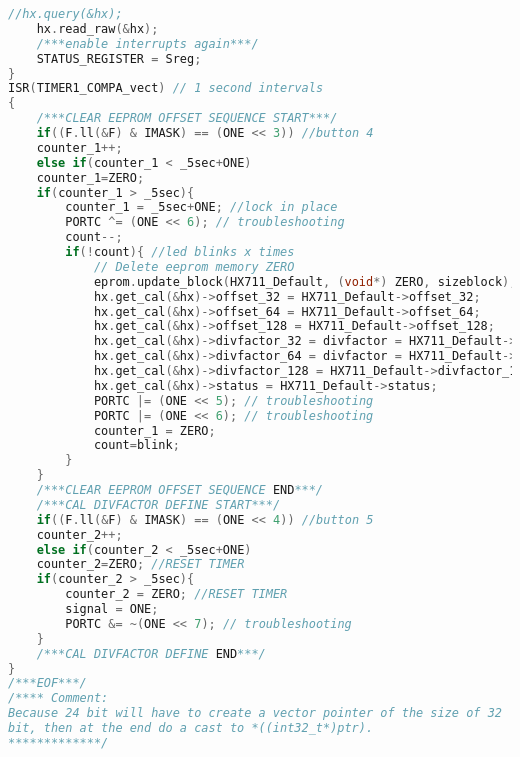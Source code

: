 \begin{lstlisting}[language=C, caption={main.c}, label=main-c, captionpos=b]
	//hx.query(&hx);	
	hx.read_raw(&hx);
	/***enable interrupts again***/
	STATUS_REGISTER = Sreg;
}
ISR(TIMER1_COMPA_vect) // 1 second intervals
{
	/***CLEAR EEPROM OFFSET SEQUENCE START***/
	if((F.ll(&F) & IMASK) == (ONE << 3)) //button 4
	counter_1++;
	else if(counter_1 < _5sec+ONE)
	counter_1=ZERO;
	if(counter_1 > _5sec){
		counter_1 = _5sec+ONE; //lock in place
		PORTC ^= (ONE << 6); // troubleshooting
		count--;
		if(!count){ //led blinks x times
			// Delete eeprom memory ZERO
			eprom.update_block(HX711_Default, (void*) ZERO, sizeblock);
			hx.get_cal(&hx)->offset_32 = HX711_Default->offset_32;
			hx.get_cal(&hx)->offset_64 = HX711_Default->offset_64;
			hx.get_cal(&hx)->offset_128 = HX711_Default->offset_128;
			hx.get_cal(&hx)->divfactor_32 = divfactor = HX711_Default->divfactor_32;
			hx.get_cal(&hx)->divfactor_64 = divfactor = HX711_Default->divfactor_64;
			hx.get_cal(&hx)->divfactor_128 = HX711_Default->divfactor_128;
			hx.get_cal(&hx)->status = HX711_Default->status;
			PORTC |= (ONE << 5); // troubleshooting
			PORTC |= (ONE << 6); // troubleshooting
			counter_1 = ZERO;
			count=blink;
		}
	}
	/***CLEAR EEPROM OFFSET SEQUENCE END***/
	/***CAL DIVFACTOR DEFINE START***/
	if((F.ll(&F) & IMASK) == (ONE << 4)) //button 5
	counter_2++;
	else if(counter_2 < _5sec+ONE)
	counter_2=ZERO; //RESET TIMER
	if(counter_2 > _5sec){
		counter_2 = ZERO; //RESET TIMER
		signal = ONE;
		PORTC &= ~(ONE << 7); // troubleshooting
	}
	/***CAL DIVFACTOR DEFINE END***/
}
/***EOF***/
/**** Comment:
Because 24 bit will have to create a vector pointer of the size of 32
bit, then at the end do a cast to *((int32_t*)ptr).
*************/
\end{lstlisting}


